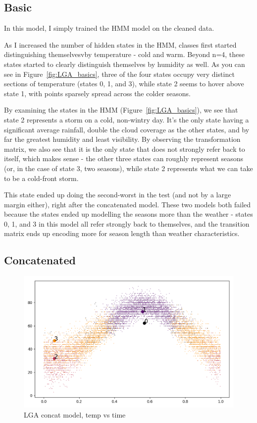 \documentclass[a4paper]{article}
\begin{document}
\subsection{Basic}

In this model, I simply trained the HMM model on the cleaned data.

As I increased the number of hidden states in the HMM, classes first started distinguishing themselvesvby temperature - cold and warm. Beyond n=4, these states started to clearly distinguish themselves by humidity as well. As you can see in Figure~\ref{fig:LGA_basics}, three of the four states occupy very distinct sections of temperature (states 0, 1, and 3), while state 2 seems to hover above state 1, with points sparsely spread across the colder seasons.

By examining the states in the HMM (Figure~\ref{fig:LGA_basics}), we see that state 2 represents a storm on a cold, non-wintry day. It's the only state having a significant average rainfall, double the cloud coverage as the other states, and by far the greatest humidity and least visibility. By observing the transformation matrix, we also see that it is the only state that does not strongly refer back to itself, which makes sense - the other three states can roughly represent seasons (or, in the case of state 3, two seasons), while state 2 represents what we can take to be a cold-front storm.

This state ended up doing the second-worst in the test (and not by a large margin either), right after the concatenated model. These two models both failed because the states ended up modelling the seasons more than the weather - states 0, 1, and 3 in this model all refer strongly back to themselves, and the transition matrix ends up encoding more for season length than weather characteristics.





\subsection{Concatenated}
\begin{figure}[t]
  \centering
  \includegraphics[width=\linewidth]{../png/models/LGA-concat-temperature4.png}
  \caption{LGA concat model, temp vs time}
  \label{fig:LGA_concat}
\end{figure}
\end{document}
